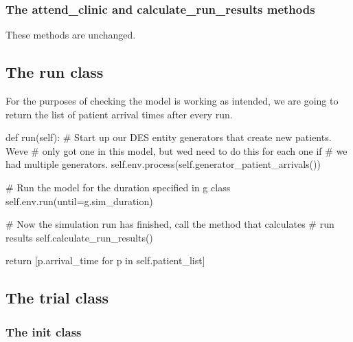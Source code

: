 \documentclass[
  letterpaper,
  DIV=11,
  numbers=noendperiod]{scrreprt}
\newenvironment{Shaded}{\begin{snugshade}}{\end{snugshade}}
\newcommand{\CommentTok}[1]{\textcolor[rgb]{0.37,0.37,0.37}{#1}}
\newcommand{\ControlFlowTok}[1]{\textcolor[rgb]{0.00,0.23,0.31}{#1}}
\newcommand{\KeywordTok}[1]{\textcolor[rgb]{0.00,0.23,0.31}{#1}}
\newcommand{\NormalTok}[1]{\textcolor[rgb]{0.00,0.23,0.31}{#1}}
\newcommand{\OperatorTok}[1]{\textcolor[rgb]{0.37,0.37,0.37}{#1}}
\newcommand{\VariableTok}[1]{\textcolor[rgb]{0.07,0.07,0.07}{#1}}
\begin{document}
\subsubsection{The attend\_clinic and calculate\_run\_results
methods}\label{the-attend_clinic-and-calculate_run_results-methods}

These methods are unchanged.

\subsection{The run class}\label{the-run-class}

For the purposes of checking the model is working as intended, we are
going to return the list of patient arrival times after every run.

\begin{Shaded}
\begin{Highlighting}[]
    \KeywordTok{def}\NormalTok{ run(}\VariableTok{self}\NormalTok{):}
        \CommentTok{\# Start up our DES entity generators that create new patients.  We\textquotesingle{}ve}
        \CommentTok{\# only got one in this model, but we\textquotesingle{}d need to do this for each one if}
        \CommentTok{\# we had multiple generators.}
        \VariableTok{self}\NormalTok{.env.process(}\VariableTok{self}\NormalTok{.generator\_patient\_arrivals())}

        \CommentTok{\# Run the model for the duration specified in g class}
        \VariableTok{self}\NormalTok{.env.run(until}\OperatorTok{=}\NormalTok{g.sim\_duration)}

        \CommentTok{\# Now the simulation run has finished, call the method that calculates}
        \CommentTok{\# run results}
        \VariableTok{self}\NormalTok{.calculate\_run\_results()}

        \ControlFlowTok{return}\NormalTok{ [p.arrival\_time }\ControlFlowTok{for}\NormalTok{ p }\KeywordTok{in} \VariableTok{self}\NormalTok{.patient\_list]}
\end{Highlighting}
\end{Shaded}

\subsection{The trial class}\label{the-trial-class-6}

\subsubsection{\texorpdfstring{The \textbf{init}
class}{The init class}}\label{the-init-class}
\end{document}
